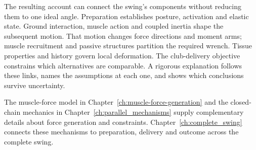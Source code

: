The resulting account can connect the swing's components without reducing them to one ideal angle. Preparation establishes posture, activation and elastic state. Ground interaction, muscle action and coupled inertia shape the subsequent motion. That motion changes force directions and moment arms; muscle recruitment and passive structures partition the required wrench. Tissue properties and history govern local deformation. The club-delivery objective constrains which alternatives are comparable. A rigorous explanation follows these links, names the assumptions at each one, and shows which conclusions survive uncertainty.

The muscle-force model in Chapter~\ref{ch:muscle-force-generation} and the closed-chain mechanics in Chapter~\ref{ch:parallel_mechanisms} supply complementary details about force generation and constraints. Chapter~\ref{ch:complete_swing} connects these mechanisms to preparation, delivery and outcome across the complete swing.

